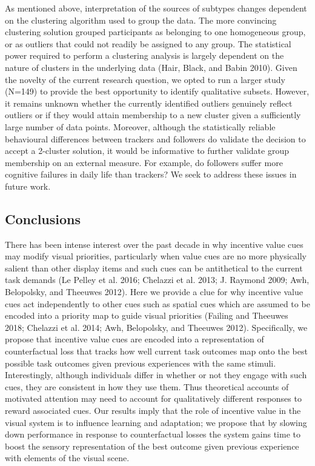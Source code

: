 \documentclass[11pt,halfline,a4paper,]{ouparticle}
\begin{document}
As mentioned above, interpretation of the sources of subtypes changes dependent on the clustering algorithm used to group the data. The more convincing clustering solution grouped participants as belonging to one homogeneous group, or as outliers that could not readily be assigned to any group. The statistical power required to perform a clustering analysis is largely dependent on the nature of clusters in the underlying data (Hair, Black, and Babin 2010). Given the novelty of the current research question, we opted to run a larger study (N=149) to provide the best opportunity to identify qualitative subsets. However, it remains unknown whether the currently identified outliers genuinely reflect outliers or if they would attain membership to a new cluster given a sufficiently large number of data points. Moreover, although the statistically reliable behavioural differences between trackers and followers do validate the decision to accept a 2-cluster solution, it would be informative to further validate group membership on an external measure. For example, do followers suffer more cognitive failures in daily life than trackers? We seek to address these issues in future work.

\hypertarget{conclusions}{%
\subsection{Conclusions}\label{conclusions}}

\label{sec:conclusions}

There has been intense interest over the past decade in why incentive value cues may modify visual priorities, particularly when value cues are no more physically salient than other display items and such cues can be antithetical to the current task demands (Le Pelley et al. 2016; Chelazzi et al. 2013; J. Raymond 2009; Awh, Belopolsky, and Theeuwes 2012). Here we provide a clue for why incentive value cues act independently to other cues such as spatial cues which are assumed to be encoded into a priority map to guide visual priorities (Failing and Theeuwes 2018; Chelazzi et al. 2014; Awh, Belopolsky, and Theeuwes 2012). Specifically, we propose that incentive value cues are encoded into a representation of counterfactual loss that tracks how well current task outcomes map onto the best possible task outcomes given previous experiences with the same stimuli. Interestingly, although individuals differ in whether or not they engage with such cues, they are consistent in how they use them. Thus theoretical accounts of motivated attention may need to account for qualitatively different responses to reward associated cues. Our results imply that the role of incentive value in the visual system is to influence learning and adaptation; we propose that by slowing down performance in response to counterfactual losses the system gains time to boost the sensory representation of the best outcome given previous experience with elements of the visual scene.
\end{document}
